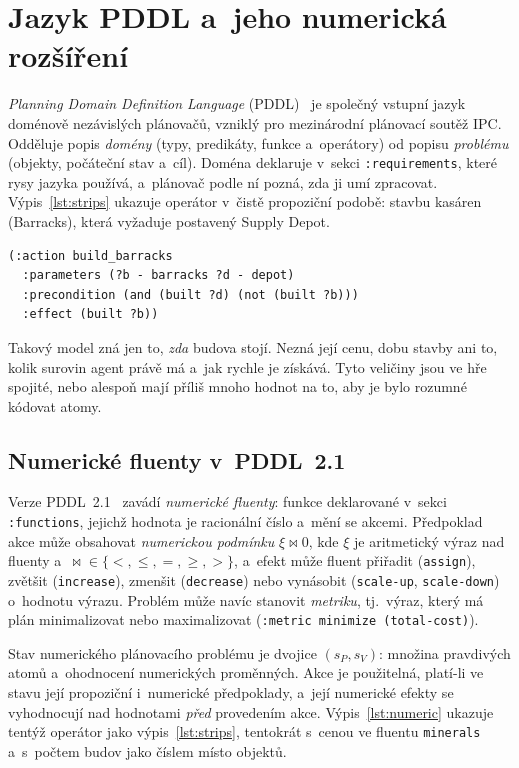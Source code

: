 \section{Jazyk PDDL a~jeho numerická rozšíření}
\label{sec:pddl}

\emph{Planning Domain Definition Language} (PDDL)~\cite{Ghallab1998} je společný vstupní jazyk doménově nezávislých plánovačů, vzniklý pro mezinárodní plánovací soutěž IPC. Odděluje popis \emph{domény} (typy, predikáty, funkce a~operátory) od popisu \emph{problému} (objekty, počáteční stav a~cíl). Doména deklaruje v~sekci \texttt{:requirements}, které rysy jazyka používá, a~plánovač podle ní pozná, zda ji umí zpracovat. Výpis~\ref{lst:strips} ukazuje operátor v~čistě propoziční podobě: stavbu kasáren (Barracks), která vyžaduje postavený Supply Depot.

\begin{lstlisting}[caption={Propoziční operátor v~PDDL.},label=lst:strips,float,basicstyle=\ttfamily\small]
(:action build_barracks
  :parameters (?b - barracks ?d - depot)
  :precondition (and (built ?d) (not (built ?b)))
  :effect (built ?b))
\end{lstlisting}

Takový model zná jen to, \emph{zda} budova stojí. Nezná její cenu, dobu stavby ani to, kolik surovin agent právě má a~jak rychle je získává. Tyto veličiny jsou ve hře spojité, nebo alespoň mají příliš mnoho hodnot na to, aby je bylo rozumné kódovat atomy.

\subsection{Numerické fluenty v~PDDL~2.1}

Verze PDDL~2.1~\cite{FoxLong2003} zavádí \emph{numerické fluenty}: funkce deklarované v~sekci \texttt{:functions}, jejichž hodnota je racionální číslo a~mění se akcemi. Předpoklad akce může obsahovat \emph{numerickou podmínku} $\xi \bowtie 0$, kde $\xi$ je aritmetický výraz nad fluenty a~$\bowtie \in \{<, \le, =, \ge, >\}$, a~efekt může fluent přiřadit (\texttt{assign}), zvětšit (\texttt{increase}), zmenšit (\texttt{decrease}) nebo vynásobit (\texttt{scale-up}, \texttt{scale-down}) o~hodnotu výrazu. Problém může navíc stanovit \emph{metriku}, tj.~výraz, který má plán minimalizovat nebo maximalizovat (\texttt{:metric minimize (total-cost)}).

Stav numerického plánovacího problému je dvojice $(s_P, s_V)$: množina pravdivých atomů a~ohodnocení numerických proměnných. Akce je použitelná, platí-li ve stavu její propoziční i~numerické předpoklady, a~její numerické efekty se vyhodnocují nad hodnotami \emph{před} provedením akce. Výpis~\ref{lst:numeric} ukazuje tentýž operátor jako výpis~\ref{lst:strips}, tentokrát s~cenou ve fluentu \texttt{minerals} a~s~počtem budov jako číslem místo objektů.


